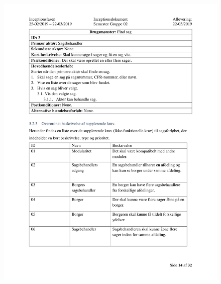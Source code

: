 \begin{figure}[hb]
  \includegraphics[scale = 0.33]{./PNG/Inceptions/Gruppe 02 + InceptionsDokument-15.jpg} 
\end{figure}

